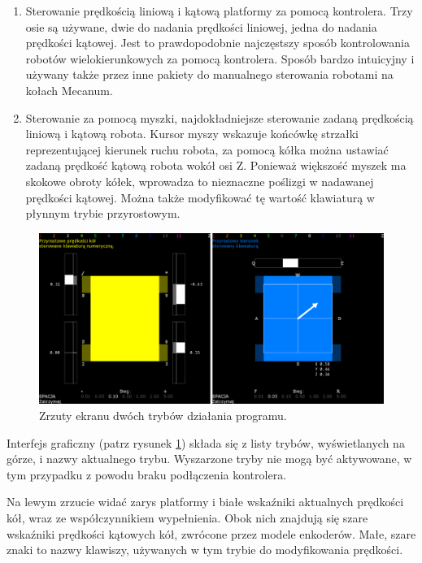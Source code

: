 \begin{enumerate}
			\item Sterowanie prędkością liniową i kątową platformy za pomocą kontrolera. Trzy osie są używane, dwie do nadania prędkości liniowej, jedna do nadania prędkości kątowej.
			Jest to prawdopodobnie najczęstszy sposób kontrolowania robotów wielokierunkowych za pomocą kontrolera.
			Sposób bardzo intuicyjny i używany także przez inne pakiety do manualnego sterowania robotami na kołach Mecanum.
			\item Sterowanie za pomocą myszki, najdokładniejsze sterowanie zadaną prędkością liniową i kątową robota.
			Kursor myszy wskazuje końcówkę strzałki reprezentującej kierunek ruchu robota, za pomocą kółka można ustawiać zadaną prędkość kątową robota wokół osi Z.
			Ponieważ większość myszek ma skokowe obroty kółek, wprowadza to nieznaczne poślizgi w nadawanej prędkości kątowej. 
			Można także modyfikować tę wartość klawiaturą w płynnym trybie przyrostowym.
		\end{enumerate}
	
	\begin{figure}[H]
	\centering
	\includegraphics[width=\textwidth]{graphics/lalkarz.png}
	\caption{Zrzuty ekranu dwóch trybów działania programu.}
	\label{fig:lalkarz}
	\end{figure}
	
	Interfejs graficzny (patrz rysunek \ref{fig:lalkarz}) składa się z listy trybów, wyświetlanych na górze, i nazwy aktualnego trybu.
	Wyszarzone tryby nie mogą być aktywowane, w tym przypadku z powodu braku podłączenia kontrolera.
	
	Na lewym zrzucie widać zarys platformy i białe wskaźniki aktualnych prędkości kół, wraz ze współczynnikiem wypełnienia.
	Obok nich znajdują się szare wskaźniki prędkości kątowych kół, zwrócone przez modele enkoderów.
	Małe, szare znaki to nazwy klawiszy, używanych w tym trybie do modyfikowania prędkości.
	
